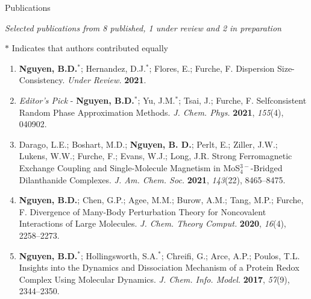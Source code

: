 \documentclass{resume} %
\begin{document}
\begin{rSection}{Publications}

  \textit{Selected publications from 8 published, 1 under review and
    2 in preparation}
  
  $*$ Indicates that authors contributed equally
  
\begin{enumerate}
\item \textbf{Nguyen, B.D.}$^*$; Hernandez, D.J.$^*$;
  Flores, E.; Furche, F. Dispersion Size-Consistency. \textit{Under Review.}
  \textbf{2021}.

\item {\em Editor's Pick} - \textbf{Nguyen, B.D.}$^*$; Yu, J.M.$^*$; Tsai, J.;
  Furche, F. Selfconsistent Random Phase Approximation Methods.
  \textit{J. Chem. Phys.} \textbf{2021}, \textit{155}(4), 040902.

\item Darago, L.E.; Boshart, M.D.; \textbf{Nguyen, B. D.}; Perlt, E.;
  Ziller, J.W.; Lukens, W.W.; Furche, F.; Evans, W.J.; Long, J.R.
  Strong Ferromagnetic Exchange Coupling and Single-Molecule Magnetism in
  MoS$_4^{3-}$-Bridged Dilanthanide Complexes. \textit{J. Am. Chem. Soc.}
  \textbf{2021}, \textit{143}(22), 8465--8475.

      
\item \textbf{Nguyen, B.D.}; Chen, G.P.; Agee, M.M.; Burow, A.M.; Tang, M.P.;
  Furche, F. Divergence of Many-Body Perturbation Theory for Noncovalent Interactions
  of Large Molecules. \textit{J. Chem. Theory Comput.} \textbf{2020}, \textit{16}(4),
  2258--2273.

\item \textbf{Nguyen, B.D.}$^*$; Hollingsworth, S.A.$^*$; Chreifi, G.;
  Arce, A.P.; Poulos, T.L. Insights into the Dynamics and Dissociation Mechanism
  of a Protein Redox Complex Using Molecular Dynamics. \textit{J. Chem. Info. Model.}
  \textbf{2017}, \textit{57}(9), 2344--2350.

%


\end{enumerate}
\end{rSection}
\end{document}
